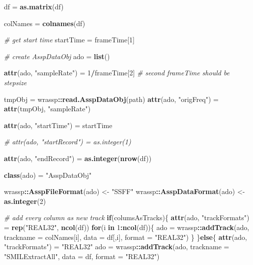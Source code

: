 \documentclass[]{book}
\newenvironment{Shaded}{\begin{snugshade}}{\end{snugshade}}
\newcommand{\CommentTok}[1]{\textcolor[rgb]{0.56,0.35,0.01}{\textit{#1}}}
\newcommand{\ControlFlowTok}[1]{\textcolor[rgb]{0.13,0.29,0.53}{\textbf{#1}}}
\newcommand{\DataTypeTok}[1]{\textcolor[rgb]{0.13,0.29,0.53}{#1}}
\newcommand{\DecValTok}[1]{\textcolor[rgb]{0.00,0.00,0.81}{#1}}
\newcommand{\KeywordTok}[1]{\textcolor[rgb]{0.13,0.29,0.53}{\textbf{#1}}}
\newcommand{\NormalTok}[1]{#1}
\newcommand{\OperatorTok}[1]{\textcolor[rgb]{0.81,0.36,0.00}{\textbf{#1}}}
\newcommand{\StringTok}[1]{\textcolor[rgb]{0.31,0.60,0.02}{#1}}
\begin{document}
\begin{Shaded}
\begin{Highlighting}[]
\NormalTok{  df =}\StringTok{ }\KeywordTok{as.matrix}\NormalTok{(df)}
  
\NormalTok{  colNames =}\StringTok{ }\KeywordTok{colnames}\NormalTok{(df)}
  
  \CommentTok{# get start time}
\NormalTok{  startTime =}\StringTok{ }\NormalTok{frameTime[}\DecValTok{1}\NormalTok{]}
  
  \CommentTok{# create AsspDataObj}
\NormalTok{  ado =}\StringTok{ }\KeywordTok{list}\NormalTok{()}
  
  \KeywordTok{attr}\NormalTok{(ado, }\StringTok{"sampleRate"}\NormalTok{) =}\StringTok{ }\DecValTok{1}\OperatorTok{/}\NormalTok{frameTime[}\DecValTok{2}\NormalTok{] }\CommentTok{# second frameTime should be stepsize}
  
\NormalTok{  tmpObj =}\StringTok{ }\NormalTok{wrassp}\OperatorTok{::}\KeywordTok{read.AsspDataObj}\NormalTok{(path)}
  \KeywordTok{attr}\NormalTok{(ado, }\StringTok{"origFreq"}\NormalTok{) =}\StringTok{ }\KeywordTok{attr}\NormalTok{(tmpObj, }\StringTok{"sampleRate"}\NormalTok{)}
  
  \KeywordTok{attr}\NormalTok{(ado, }\StringTok{"startTime"}\NormalTok{) =}\StringTok{ }\NormalTok{startTime}
  
  \CommentTok{# attr(ado, "startRecord") = as.integer(1)}
  
  \KeywordTok{attr}\NormalTok{(ado, }\StringTok{"endRecord"}\NormalTok{) =}\StringTok{ }\KeywordTok{as.integer}\NormalTok{(}\KeywordTok{nrow}\NormalTok{(df))}
  
  \KeywordTok{class}\NormalTok{(ado) =}\StringTok{ "AsspDataObj"}
  
\NormalTok{  wrassp}\OperatorTok{::}\KeywordTok{AsspFileFormat}\NormalTok{(ado) <-}\StringTok{ "SSFF"}
\NormalTok{  wrassp}\OperatorTok{::}\KeywordTok{AsspDataFormat}\NormalTok{(ado) <-}\StringTok{ }\KeywordTok{as.integer}\NormalTok{(}\DecValTok{2}\NormalTok{)}
  
  \CommentTok{# add every column as new track}
  \ControlFlowTok{if}\NormalTok{(columsAsTracks)\{}
    \KeywordTok{attr}\NormalTok{(ado, }\StringTok{"trackFormats"}\NormalTok{) =}\StringTok{ }\KeywordTok{rep}\NormalTok{(}\StringTok{"REAL32"}\NormalTok{, }\KeywordTok{ncol}\NormalTok{(df))}
    \ControlFlowTok{for}\NormalTok{(i }\ControlFlowTok{in} \DecValTok{1}\OperatorTok{:}\KeywordTok{ncol}\NormalTok{(df))\{}
\NormalTok{      ado =}\StringTok{ }\NormalTok{wrassp}\OperatorTok{::}\KeywordTok{addTrack}\NormalTok{(ado,}
                             \DataTypeTok{trackname =}\NormalTok{ colNames[i],}
                             \DataTypeTok{data =}\NormalTok{ df[,i],}
                             \DataTypeTok{format =} \StringTok{"REAL32"}\NormalTok{)}
\NormalTok{    \}}
\NormalTok{  \}}\ControlFlowTok{else}\NormalTok{\{}
    \KeywordTok{attr}\NormalTok{(ado, }\StringTok{"trackFormats"}\NormalTok{) =}\StringTok{ "REAL32"}
\NormalTok{    ado =}\StringTok{ }\NormalTok{wrassp}\OperatorTok{::}\KeywordTok{addTrack}\NormalTok{(ado,}
                           \DataTypeTok{trackname =} \StringTok{"SMILExtractAll"}\NormalTok{,}
                           \DataTypeTok{data =}\NormalTok{ df,}
                           \DataTypeTok{format =} \StringTok{"REAL32"}\NormalTok{)}
    

\end{Highlighting}
\end{Shaded}
\end{document}
